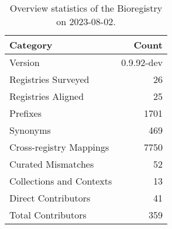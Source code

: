 \begin{table}
\caption{Overview statistics of the Bioregistry on 2023-08-02.}
\label{tab:bioregistry-summary}
\begin{tabular}{lr}
\toprule
Category & Count \\
\midrule
Version & 0.9.92-dev \\
Registries Surveyed & 26 \\
Registries Aligned & 25 \\
Prefixes & 1701 \\
Synonyms & 469 \\
Cross-registry Mappings & 7750 \\
Curated Mismatches & 52 \\
Collections and Contexts & 13 \\
Direct Contributors & 41 \\
Total Contributors & 359 \\
\bottomrule
\end{tabular}
\end{table}
